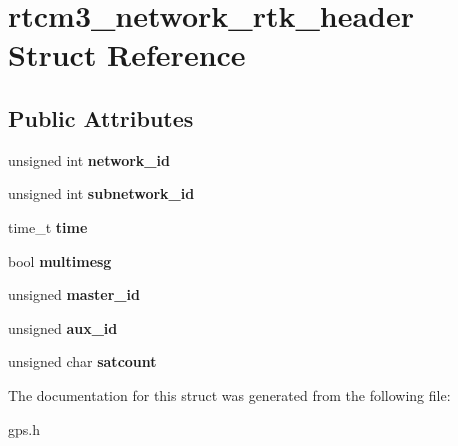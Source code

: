 \hypertarget{structrtcm3__network__rtk__header}{\section{rtcm3\-\_\-network\-\_\-rtk\-\_\-header \-Struct \-Reference}
\label{structrtcm3__network__rtk__header}
}
\subsection*{\-Public \-Attributes}
\begin{DoxyCompactItemize}
\item 
\hypertarget{structrtcm3__network__rtk__header_aca628a26b8e86f5c9c9be957a71e5f43}{unsigned int {\bfseries network\-\_\-id}}\label{structrtcm3__network__rtk__header_aca628a26b8e86f5c9c9be957a71e5f43}

\item 
\hypertarget{structrtcm3__network__rtk__header_a75f12a316df77a4ed0b8d547d2052ff5}{unsigned int {\bfseries subnetwork\-\_\-id}}\label{structrtcm3__network__rtk__header_a75f12a316df77a4ed0b8d547d2052ff5}

\item 
\hypertarget{structrtcm3__network__rtk__header_a097397e7fa42acdb1cd8dd447e88e5a5}{time\-\_\-t {\bfseries time}}\label{structrtcm3__network__rtk__header_a097397e7fa42acdb1cd8dd447e88e5a5}

\item 
\hypertarget{structrtcm3__network__rtk__header_a0beb2bd65ac655915d97a20b0485ab09}{bool {\bfseries multimesg}}\label{structrtcm3__network__rtk__header_a0beb2bd65ac655915d97a20b0485ab09}

\item 
\hypertarget{structrtcm3__network__rtk__header_ad9e57156d9c027ddc4e5a3c64a903da8}{unsigned {\bfseries master\-\_\-id}}\label{structrtcm3__network__rtk__header_ad9e57156d9c027ddc4e5a3c64a903da8}

\item 
\hypertarget{structrtcm3__network__rtk__header_a79422757f6a3308d6b81dd1241c1bbfb}{unsigned {\bfseries aux\-\_\-id}}\label{structrtcm3__network__rtk__header_a79422757f6a3308d6b81dd1241c1bbfb}

\item 
\hypertarget{structrtcm3__network__rtk__header_a385e3c34ca9b5b06fcda565fce4c628a}{unsigned char {\bfseries satcount}}\label{structrtcm3__network__rtk__header_a385e3c34ca9b5b06fcda565fce4c628a}

\end{DoxyCompactItemize}


\-The documentation for this struct was generated from the following file\-:\begin{DoxyCompactItemize}
\item 
gps.\-h\end{DoxyCompactItemize}
